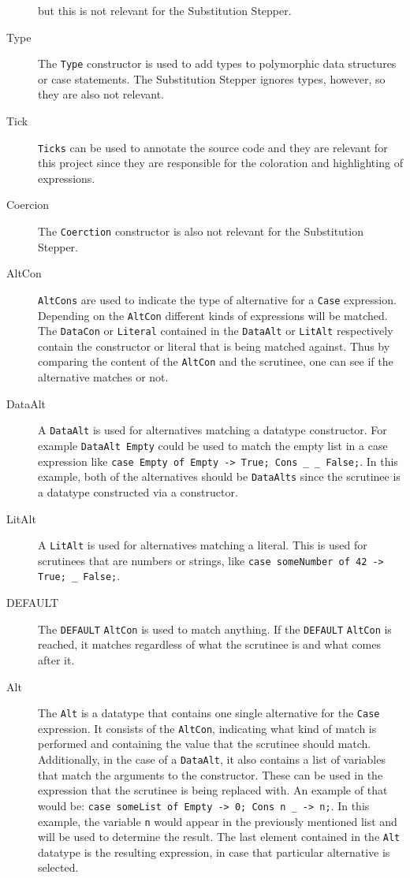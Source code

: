 \begin{description}
        but this is not relevant for the Substitution Stepper.
    \item[Type] The \texttt{Type} constructor is used to add types to polymorphic data structures or case statements.
        The Substitution Stepper ignores types, however, so they are also not relevant.
    \item[Tick] \texttt{Ticks} can be used to annotate the source code and they are relevant for this project
        since they are responsible for the coloration and highlighting of expressions.
    \item[Coercion] The \texttt{Coerction} constructor is also not relevant for the Substitution Stepper.
\end{description}

\begin{description}
    \item[AltCon] \texttt{AltCons} are used to indicate the type of alternative for a \texttt{Case} expression.
        Depending on the \texttt{AltCon} different kinds of expressions will be matched.
        The \texttt{DataCon} or \texttt{Literal} contained in the \texttt{DataAlt} or \texttt{LitAlt} respectively contain the constructor or literal that is being matched against.
        Thus by comparing the content of the \texttt{AltCon} and the scrutinee, one can see if the alternative matches or not.
    \item[DataAlt] A \texttt{DataAlt} is used for alternatives matching a datatype constructor.
        For example \texttt{DataAlt Empty} could be used to match the empty list in a case expression like \texttt{case Empty of Empty -> True; Cons \_ \_ False;}.
        In this example, both of the alternatives should be \texttt{DataAlts} since the scrutinee is a datatype constructed via a constructor.
    \item[LitAlt] A \texttt{LitAlt} is used for alternatives matching a literal.
        This is used for scrutinees that are numbers or strings, like \texttt{case someNumber of 42 -> True; \_ False;}.
    \item[DEFAULT] The \texttt{DEFAULT} \texttt{AltCon} is used to match anything.
        If the \texttt{DEFAULT} \texttt{AltCon} is reached, it matches regardless of what the scrutinee is and what comes after it.
    \item[Alt] The \texttt{Alt} is a datatype that contains one single alternative for the \texttt{Case} expression.
        It consists of the \texttt{AltCon}, indicating what kind of match is performed and containing the value that the scrutinee should match.
        Additionally, in the case of a \texttt{DataAlt}, it also contains a list of variables that match the arguments to the constructor.
        These can be used in the expression that the scrutinee is being replaced with.
        An example of that would be: \texttt{case someList of Empty -> 0; Cons n \_ -> n;}.
        In this example, the variable \texttt{n} would appear in the previously mentioned list and will be used to determine the result.
        The last element contained in the \texttt{Alt} datatype is the resulting expression,
        in case that particular alternative is selected.
\end{description}

